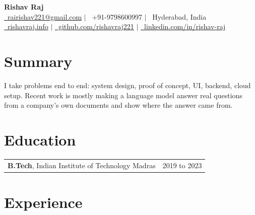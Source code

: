 \documentclass[a4paper,9pt]{article}
\begin{document}
\pagestyle{empty}
\color[HTML]{110223}

\begin{center}
  {\color[HTML]{1C033C}\LARGE\textbf{Rishav Raj}}\\[3pt]
  \small
  \href{mailto:rairishav221@gmail.com}{\faEnvelope~rairishav221@gmail.com} \;$|$\;
  \faMobile~+91-9798600997 \;$|$\;
  \faMapMarker~Hyderabad, India\\[2pt]
  \href{https://rishavraj.info}{\faGlobe~rishavraj.info} \;$|$\;
  \href{https://github.com/rishavraj221}{\faGithub~github.com/rishavraj221} \;$|$\;
  \href{https://www.linkedin.com/in/rishav-raj-2639341a5/}{\faLinkedin~linkedin.com/in/rishav-raj}
\end{center}

\vspace{-2pt}

\section{Summary}
\color[HTML]{1C033C}\small
I take problems end to end: system design, proof of concept, UI, backend, cloud setup. Recent work is mostly making a language model answer real questions from a company's own documents and show where the answer came from.

\section{Education}
\color[HTML]{1C033C}\small
\begin{tabularx}{\linewidth}{@{}X r@{}}
  \textbf{B.Tech}, Indian Institute of Technology Madras & \color[HTML]{371e77}\small{2019 to 2023}
\end{tabularx}

\section{Experience}
\end{document}
